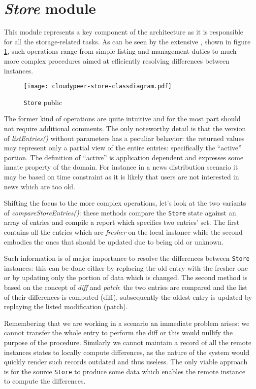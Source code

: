 \section{\textit{Store} module}
This module represents a key component of the \cloudypeer architecture
as it is responsible for all the storage-related tasks. As can be seen
by the extensive \api, shown in figure
\ref{fig:cloudypeer-store-class}, such operations range from simple
listing and management duties to much more complex procedures aimed at
efficiently resolving differences between instances.

\begin{figure}[h!]
  \centering
  \texttt{[image: cloudypeer-store-classdiagram.pdf]}
  \caption{\texttt{Store} public \api}
  \label{fig:cloudypeer-store-class}
\end{figure}

The former kind of operations are quite intuitive and for the most
part should not require additional comments. The only noteworthy
detail is that the version of \textit{listEntries()} without parameters
has a peculiar behavior: the returned values may represent only a
partial view of the entire entries: specifically the ``active''
portion. The definition of ``active'' is application dependent and
expresses some innate property of the domain. For instance in a news
distribution scenario it may be based on time constraint as it is likely
that users are not interested in news which are too old.

Shifting the focus to the more complex operations, let's look at the
two variants of
\textit{compareStoreEntries()}: these methods compare the \texttt{Store}
state against an array of entries and compile a report which specifies
two entries' set. The first contains all the entries
which are \textit{fresher} on the local instance while the second embodies
the ones that should be updated due to being old or unknown.

Such information is of major importance to resolve the differences between
\texttt{Store} instances: this can be done either by replacing the old
entry with the fresher one or by updating only the portion of data
 which is changed. The second method is based on the
concept of \textit{diff} and \textit{patch}: the two entries are
compared and the list of their differences is computed (diff),
subsequently the oldest entry is updated by replaying the listed
modification (patch).

Remembering that we are working in a \ptop scenario an immediate
problem arises: we cannot transfer the whole entry to perform the
diff or this would nullify the purpose of the procedure. Similarly
we cannot maintain a record of all the remote instances states to
locally compute differences, as the
\ptop nature of the system would quickly render such records outdated
and thus useless. The only
viable approach is for the source \texttt{Store} to produce some data
which enables the remote instance to compute the differences.

